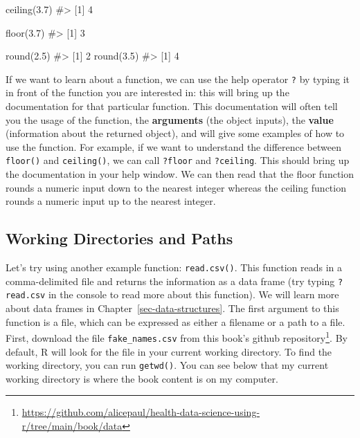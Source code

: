 \documentclass[
  letterpaper,
]{krantz}
\makeatletter
\newenvironment{Shaded}{\begin{snugshade}}{\end{snugshade}}
\newcommand{\CommentTok}[1]{\textcolor[rgb]{0.37,0.37,0.37}{#1}}
\newcommand{\FloatTok}[1]{\textcolor[rgb]{0.68,0.00,0.00}{#1}}
\newcommand{\FunctionTok}[1]{\textcolor[rgb]{0.28,0.35,0.67}{#1}}
\newcommand{\NormalTok}[1]{\textcolor[rgb]{0.00,0.23,0.31}{#1}}
\renewcommand{\href}[2]{#2\footnote{\url{#1}}}
\newenvironment{kframe}{%
\medskip{}
\setlength{\fboxsep}{.8em}
 \def\at@end@of@kframe{}%
 \ifinner\ifhmode%
  \def\at@end@of@kframe{\end{minipage}}%
  \begin{minipage}{\columnwidth}%
 \fi\fi%
 \def\FrameCommand##1{\hskip\@totalleftmargin \hskip-\fboxsep
 \colorbox{shadecolor}{##1}\hskip-\fboxsep
     \hskip-\linewidth \hskip-\@totalleftmargin \hskip\columnwidth}%
 \MakeFramed {\advance\hsize-\width
   \@totalleftmargin\z@ \linewidth\hsize
   \@setminipage}}%
 {\par\unskip\endMakeFramed%
 \at@end@of@kframe}
\renewenvironment{Shaded}{\begin{kframe}}{\end{kframe}}
\makeatother
\begin{document}
\begin{Shaded}
\begin{Highlighting}[]
\FunctionTok{ceiling}\NormalTok{(}\FloatTok{3.7}\NormalTok{)}
\CommentTok{\#\textgreater{} [1] 4}
\end{Highlighting}
\end{Shaded}

\begin{Shaded}
\begin{Highlighting}[]
\FunctionTok{floor}\NormalTok{(}\FloatTok{3.7}\NormalTok{)}
\CommentTok{\#\textgreater{} [1] 3}
\end{Highlighting}
\end{Shaded}

\begin{Shaded}
\begin{Highlighting}[]
\FunctionTok{round}\NormalTok{(}\FloatTok{2.5}\NormalTok{)}
\CommentTok{\#\textgreater{} [1] 2}
\FunctionTok{round}\NormalTok{(}\FloatTok{3.5}\NormalTok{)}
\CommentTok{\#\textgreater{} [1] 4}
\end{Highlighting}
\end{Shaded}

If we want to learn about a function, we can use the help operator
\texttt{?} by typing it in front of the function you are interested in:
this will bring up the documentation for that particular function. This
documentation will often tell you the usage of the function, the
\textbf{arguments} (the object inputs), the \textbf{value} (information
about the returned object), and will give some examples of how to use
the function. For example, if we want to understand the difference
between \texttt{floor()} and \texttt{ceiling()}, we can call
\texttt{?floor} and \texttt{?ceiling}. This should bring up the
documentation in your help window. We can then read that the floor
function rounds a numeric input down to the nearest integer whereas the
ceiling function rounds a numeric input up to the nearest integer.

\hypertarget{working-directories-and-paths}{%
\subsection{Working Directories and
Paths}\label{working-directories-and-paths}}

Let's try using another example function: \texttt{read.csv()}. This
function reads in a comma-delimited file and returns the information as
a data frame (try typing \texttt{?read.csv} in the console to read more
about this function). We will learn more about data frames in
Chapter~\ref{sec-data-structures}. The first argument to this function
is a file, which can be expressed as either a filename or a path to a
file. First, download the file \texttt{fake\_names.csv} from this book's
\href{https://github.com/alicepaul/health-data-science-using-r/tree/main/book/data}{github
repository}. By default, R will look for the file in your current
working directory. To find the working directory, you can run
\texttt{getwd()}. You can see below that my current working directory is
where the book content is on my computer.
\end{document}

